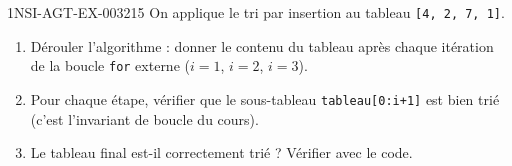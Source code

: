 \begin{exercice}{1NSI-AGT-EX-003}{2}{15}
On applique le tri par insertion au tableau \lstinline{[4, 2, 7, 1]}.
\begin{enumerate}
  \item Dérouler l'algorithme : donner le contenu du tableau après chaque itération de la boucle \lstinline{for} externe ($i=1$, $i=2$, $i=3$).
  \item Pour chaque étape, vérifier que le sous-tableau \lstinline{tableau[0:i+1]} est bien trié (c'est l'invariant de boucle du cours).
  \item Le tableau final est-il correctement trié ? Vérifier avec le code.
\end{enumerate}
\end{exercice}
